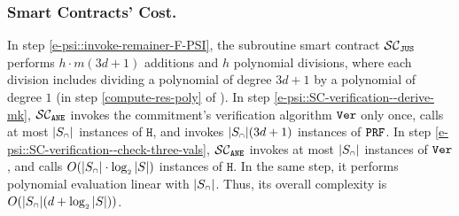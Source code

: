 \vspace{-5mm}
 \subsubsection{Smart Contracts' Cost.}

In step \ref{e-psi::invoke-remainer-F-PSI}, the subroutine smart contract $\mathcal{SC}_{\mathtt{JUS}}$ performs $h\cdot m(3d+1)$ additions and $h$ polynomial divisions,  where each division includes dividing a polynomial of degree $3d+1$ by a polynomial of degree $1$ (in step \ref{compute-res-poly} of \fpsi). In step \ref{e-psi::SC-verification--derive-mk}, $\mathcal{SC}_{\mathtt{ANE}}$ invokes the commitment's verification algorithm $\mathtt{Ver}$ only once,  calls at most $|S_{\scriptscriptstyle \cap}|$ instances of  $\mathtt{H}$, and invokes $|S_{\scriptscriptstyle \cap}| (3d+1)$ instances of $\mathtt{PRF}$. In step \ref{e-psi::SC-verification--check-three-vals}, $\mathcal{SC}_{\mathtt{ANE}}$ invokes  at most $|S_{\scriptscriptstyle \cap}|$ instances of $\mathtt{Ver}$, and calls $O(|S_{\scriptscriptstyle \cap}|\cdot \log_{\scriptscriptstyle 2} |S|)$ instances of $\mathtt{H}$. In the same step, it  performs polynomial evaluation linear with  $|S_{\scriptscriptstyle \cap}|$. Thus, its overall complexity is $O( |S_{\scriptscriptstyle \cap}|(d+ \log_{\scriptscriptstyle 2} |S|))$.
%












%

  



